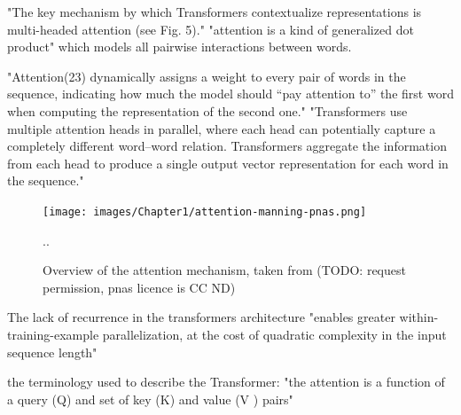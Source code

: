 "The key mechanism by which Transformers contextualize representations  is  multi-headed  attention  (see  Fig.  5)."  \citep{manning2020emergent} 
"attention is a kind of generalized dot product" %
which models all pairwise interactions between words.

"Attention(23) dynamically assigns a weight to every pair of words in the sequence, indicating how much the model should “pay attention to” the first word when computing the representation of the second one."  \citep{manning2020emergent}
"Transformers use multiple attention heads in parallel, where  each  head  can  potentially  capture  a  completely  different word–word relation. Transformers aggregate the information from each head to produce a single output vector representation for each word in the sequence." \citep{manning2020emergent}

\begin{figure}[H]
	\centering
	\texttt{[image: images/Chapter1/attention-manning-pnas.png]} 
	\caption{Overview of the attention mechanism, taken from \citet{manning2020emergent} (TODO: request permission, pnas licence is CC ND)} 
	\label{fig:manning_attention} 
	\medskip
	\small
	..
\end{figure}

The lack of recurrence in the transformers architecture "enables greater within-training-example parallelization, at the cost of quadratic complexity in the input sequence length" \citep{liu2018generating} 


the terminology used to describe the Transformer: "the attention is a function of a query (Q) and set of key (K) and value (V ) pairs" \citep{liu2018generating} 





